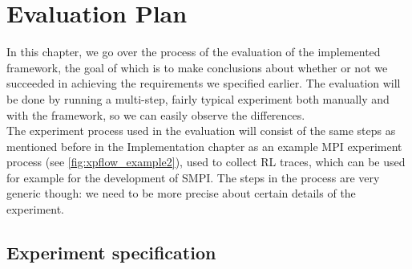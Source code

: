 



\chapter{Evaluation Plan}
\label{Chapter5}

\label{sec:evaluation_plan}
In this chapter, we go over the process of the evaluation of the
implemented framework, the goal of which is to make
conclusions about whether or not we succeeded in achieving the
requirements we specified earlier. The evaluation will be done by
running a multi-step, fairly typical experiment both manually and with
the framework, so we can easily observe the differences.\\
The experiment process used in the evaluation will consist of the same
steps as mentioned before in the Implementation chapter as an example
MPI experiment process (see \ref{fig:xpflow_example2}), used to collect
RL traces, which can be used for example for the development of
SMPI. The steps in the process are very generic though: we need to be
more precise about certain details of the experiment.
\section{Experiment specification}
